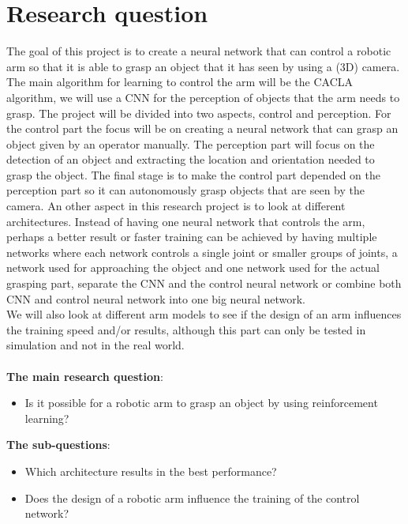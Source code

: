 \section{Research question}
The goal of this project is to create a neural network that can control a robotic arm so that it is able to grasp an object that it has seen by using a (3D) camera. 
The main algorithm for learning to control the arm will be the CACLA algorithm, we will use a CNN for the perception of objects that the arm needs to grasp. 
The project will be divided into two aspects, control and perception. For the control part the focus will be on creating a neural network that can grasp an object given by an operator manually. The perception part 
will focus on the detection of an object and extracting the location and orientation needed to grasp the object. The final stage is to make the control part depended on the perception part so it can autonomously grasp objects
that are seen by the camera. An other aspect in this research project is to look at different architectures. Instead of having one neural network that controls the arm, perhaps a better result or faster training can be 
achieved by having multiple networks where each network controls a single joint or smaller groups of joints, a network used for approaching the object and one network used for the actual grasping part, separate the CNN and 
the control neural network or combine both CNN and control neural network into one big neural network. \\
We will also look at different arm models to see if the design of an arm influences the training speed and/or results, although this part can only be tested in simulation and not in the real world.  \\ \\
\textbf{The main research question}:    
\begin{itemize}
  \item  Is it possible for a robotic arm to grasp an object by using reinforcement learning?
\end{itemize}                                
\textbf{The sub-questions}: 
\begin{itemize}
  \item Which architecture results in the best performance? 
  \item Does the design of a robotic arm influence the training of the control network?
\end{itemize}
